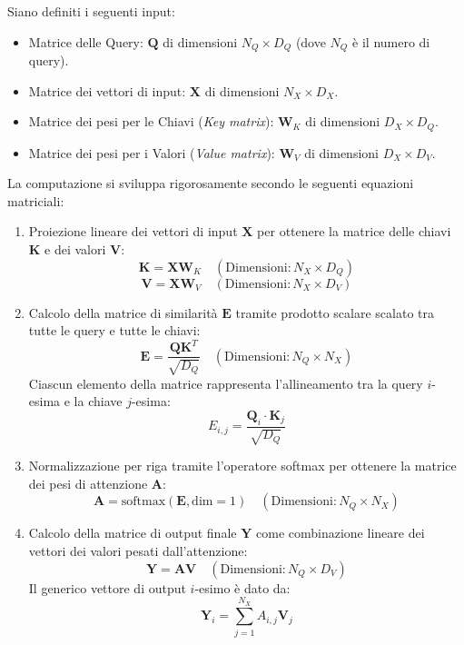 ﻿\documentclass[11pt, a4paper]{article}
\begin{document}

Siano definiti i seguenti input:
\begin{itemize}
    \item Matrice delle Query: $\bm{Q}$ di dimensioni $N_Q \times D_Q$ (dove $N_Q$ è il numero di query).
    \item Matrice dei vettori di input: $\bm{X}$ di dimensioni $N_X \times D_X$.
    \item Matrice dei pesi per le Chiavi (\emph{Key matrix}): $\bm{W}_K$ di dimensioni $D_X \times D_Q$.
    \item Matrice dei pesi per i Valori (\emph{Value matrix}): $\bm{W}_V$ di dimensioni $D_X \times D_V$.
\end{itemize}

La computazione si sviluppa rigorosamente secondo le seguenti equazioni matriciali:

\begin{enumerate}
    \item Proiezione lineare dei vettori di input $\bm{X}$ per ottenere la matrice delle chiavi $\bm{K}$ e dei valori $\bm{V}$:
    \[ \bm{K} = \bm{X} \bm{W}_K \quad (\text{Dimensioni}: N_X \times D_Q) \]
    \[ \bm{V} = \bm{X} \bm{W}_V \quad (\text{Dimensioni}: N_X \times D_V) \]

    \item Calcolo della matrice di similarità $\bm{E}$ tramite prodotto scalare scalato tra tutte le query e tutte le chiavi:
    \[ \bm{E} = \frac{\bm{Q}\bm{K}^T}{\sqrt{D_Q}} \quad (\text{Dimensioni}: N_Q \times N_X) \]
    Ciascun elemento della matrice rappresenta l'allineamento tra la query $i$-esima e la chiave $j$-esima:
    \[ E_{i,j} = \frac{\bm{Q}_i \cdot \bm{K}_j}{\sqrt{D_Q}} \]

    \item Normalizzazione per riga tramite l'operatore softmax per ottenere la matrice dei pesi di attenzione $\bm{A}$:
    \[ \bm{A} = \text{softmax}(\bm{E}, \text{dim}=1) \quad (\text{Dimensioni}: N_Q \times N_X) \]

    \item Calcolo della matrice di output finale $\bm{Y}$ come combinazione lineare dei vettori dei valori pesati dall'attenzione:
    \[ \boxed{\bm{Y} = \bm{A}\bm{V}} \quad (\text{Dimensioni}: N_Q \times D_V) \]
    Il generico vettore di output $i$-esimo è dato da:
    \[ \bm{Y}_i = \sum_{j=1}^{N_X} A_{i,j} \bm{V}_j \]
\end{enumerate}
\end{document}
